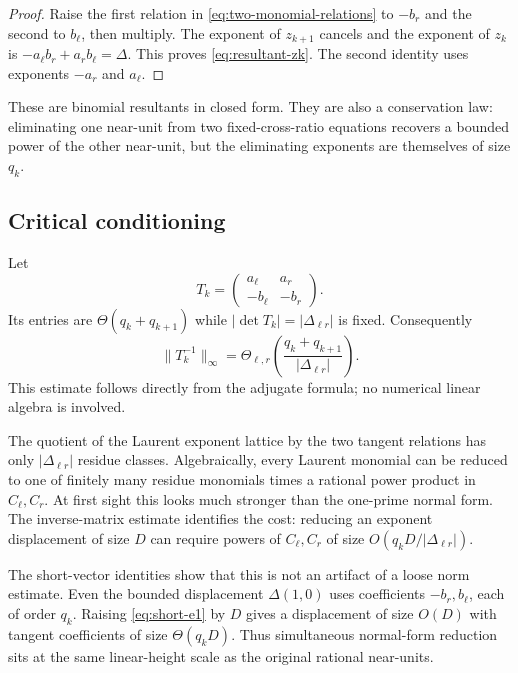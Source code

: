 \documentclass[11pt,oneside]{article}
\theoremstyle{definition}
\theoremstyle{remark}
\begin{document}
\begin{proof}
Raise the first relation in \eqref{eq:two-monomial-relations} to $-b_r$ and the second to
$b_\ell$, then multiply.  The exponent of $z_{k+1}$ cancels and the exponent of $z_k$ is
$-a_\ell b_r+a_rb_\ell=\Delta$.  This proves \eqref{eq:resultant-zk}.  The second identity
uses exponents $-a_r$ and $a_\ell$.
\end{proof}

These are binomial resultants in closed form.  They are also a conservation law: eliminating
one near-unit from two fixed-cross-ratio equations recovers a bounded power of the other
near-unit, but the eliminating exponents are themselves of size $q_k$.

\subsection{Critical conditioning}

Let
\begin{equation}
 T_k=
 \begin{pmatrix}
 a_\ell&a_r\\
 -b_\ell&-b_r
 \end{pmatrix}.
 \label{eq:tangent-matrix}
\end{equation}
Its entries are $\Theta(q_k+q_{k+1})$ while $|\det T_k|=|\Delta_{\ell r}|$ is fixed.
Consequently
\begin{equation}
 \lVert T_k^{-1}\rVert_\infty
 =\Theta_{\ell,r}\!\left(\frac{q_k+q_{k+1}}{|\Delta_{\ell r}|}\right).
 \label{eq:condition-number}
\end{equation}
This estimate follows directly from the adjugate formula; no numerical linear algebra is
involved.

The quotient of the Laurent exponent lattice by the two tangent relations has only
$|\Delta_{\ell r}|$ residue classes.  Algebraically, every Laurent monomial can be reduced
to one of finitely many residue monomials times a rational power product in $C_\ell,C_r$.
At first sight this looks much stronger than the one-prime normal form.  The inverse-matrix
estimate identifies the cost: reducing an exponent displacement of size $D$ can require
powers of $C_\ell,C_r$ of size $O(q_kD/|\Delta_{\ell r}|)$.

The short-vector identities show that this is not an artifact of a loose norm estimate.
Even the bounded displacement $\Delta(1,0)$ uses coefficients $-b_r,b_\ell$, each of order
$q_k$.  Raising \eqref{eq:short-e1} by $D$ gives a displacement of size $O(D)$ with tangent
coefficients of size $\Theta(q_kD)$.  Thus simultaneous normal-form reduction sits at the
same linear-height scale as the original rational near-units.
\end{document}
